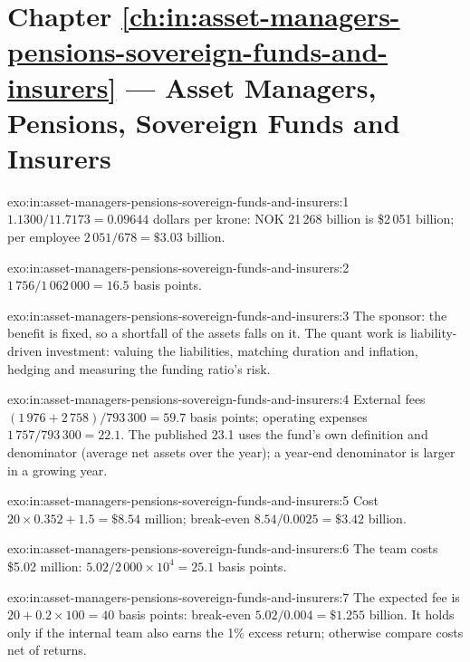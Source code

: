 \section*{Chapter \ref{ch:in:asset-managers-pensions-sovereign-funds-and-insurers} --- Asset Managers, Pensions, Sovereign Funds and Insurers}

\begin{solution}{exo:in:asset-managers-pensions-sovereign-funds-and-insurers:1}
$1.1300/11.7173=0.09644$ dollars per krone: NOK 21\,268 billion is \$2\,051 billion; per employee $2\,051/678=\$3.03$
billion.
\end{solution}

\begin{solution}{exo:in:asset-managers-pensions-sovereign-funds-and-insurers:2}
$1\,756/1\,062\,000=16.5$ basis points.
\end{solution}

\begin{solution}{exo:in:asset-managers-pensions-sovereign-funds-and-insurers:3}
The sponsor: the benefit is fixed, so a shortfall of the assets falls on it. The quant work is liability-driven
investment: valuing the liabilities, matching duration and inflation, hedging and measuring the funding ratio's risk.
\end{solution}

\begin{solution}{exo:in:asset-managers-pensions-sovereign-funds-and-insurers:4}
External fees $(1\,976+2\,758)/793\,300=59.7$ basis points; operating expenses $1\,757/793\,300=22.1$. The published 23.1
uses the fund's own definition and denominator (average net assets over the year); a year-end denominator is larger in a
growing year.
\end{solution}

\begin{solution}{exo:in:asset-managers-pensions-sovereign-funds-and-insurers:5}
Cost $20\times0.352+1.5=\$8.54$ million; break-even $8.54/0.0025=\$3.42$ billion.
\end{solution}

\begin{solution}{exo:in:asset-managers-pensions-sovereign-funds-and-insurers:6}
The team costs \$5.02 million: $5.02/2\,000\times10^4=25.1$ basis points.
\end{solution}

\begin{solution}{exo:in:asset-managers-pensions-sovereign-funds-and-insurers:7}
The expected fee is $20+0.2\times100=40$ basis points: break-even $5.02/0.004=\$1.255$ billion. It holds only if the
internal team also earns the 1\% excess return; otherwise compare costs net of returns.
\end{solution}

